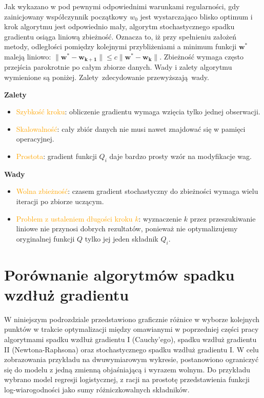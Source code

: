 Jak wykazano w \cite{dennis} pod pewnymi odpowiednimi warunkami regularności, gdy zainicjowany współczynnik początkowy $w_0$ jest wystarczająco blisko optimum i krok algorytmu jest odpowiednio mały, algorytm stochastycznego spadku gradientu osiąga liniową zbieżność. Oznacza to, iż przy spełnieniu założeń metody, odległości pomiędzy kolejnymi przybliżeniami a minimum funkcji $\mathbf{w^{\ast}}$ maleją liniowo: $\parallel \mathbf{w^{\ast}} - \mathbf{w_{k+1}} \parallel \leqslant c \parallel \mathbf{w^{\ast}} - \mathbf{w_k} \parallel$. Zbieżność wymaga często przejścia parokrotnie po całym
zbiorze danych. Wady i zalety algorytmu wymienione są poniżej. Zalety~zdecydowanie przewyższają~wady.

\textbf{Zalety} \vspace{-5pt}
\begin{itemize}
\item \textcolor{orange}{Szybkość kroku}: obliczenie gradientu wymaga wzięcia tylko jednej
obserwacji.
\item \textcolor{orange}{Skalowalność}: cały zbiór danych nie musi nawet znajdować się
w pamięci operacyjnej.
\item \textcolor{orange}{Prostota}: gradient funkcji  $Q_{i}$ daje bardzo prosty wzór na
modyfikacje wag.
\end{itemize}

\textbf{Wady}  \vspace{-5pt}
\begin{itemize}
\item \textcolor{orange}{Wolna zbieżność}: czasem gradient stochastyczny do zbieżności wymaga wielu iteracji po zbiorze uczącym.
\item \textcolor{orange}{Problem z ustaleniem długości kroku $k$}: wyznaczenie $k$
przez przeszukiwanie liniowe nie przynosi dobrych rezultatów,
ponieważ nie optymalizujemy oryginalnej funkcji $Q$ tylko jej jeden
składnik $Q_{i}$.
\end{itemize}
\newpage
\section{Porównanie algorytmów spadku wzdłuż gradientu}

W niniejszym podrozdziale przedstawiono graficznie różnice w wyborze kolejnych punktów w trakcie optymalizacji między omawianymi w poprzedniej części pracy algorytmami spadku wzdłuż gradientu I (Cauchy'ego), spadku wzdłuż gradientu II (Newtona-Raphsona) oraz stochastycznego spadku wzdłuż gradientu I. W celu zobrazowania przykładu na dwuwymiarowym wykresie, postanowiono ograniczyć się do modelu z jedną zmienną objaśniającą i wyrazem wolnym. Do przykładu wybrano model regresji logistycznej, z racji na prostotę przedstawienia funkcji log-wiarogodności jako sumy różniczkowalnych składników.

